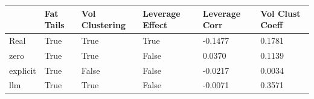 \begin{tabular}{llllll}
\toprule
 & Fat Tails & Vol Clustering & Leverage Effect & Leverage Corr & Vol Clust Coeff \\
\midrule
Real & True & True & True & -0.1477 & 0.1781 \\
zero & True & True & False & 0.0370 & 0.1139 \\
explicit & True & False & False & -0.0217 & 0.0034 \\
llm & True & True & False & -0.0071 & 0.3571 \\
\bottomrule
\end{tabular}

